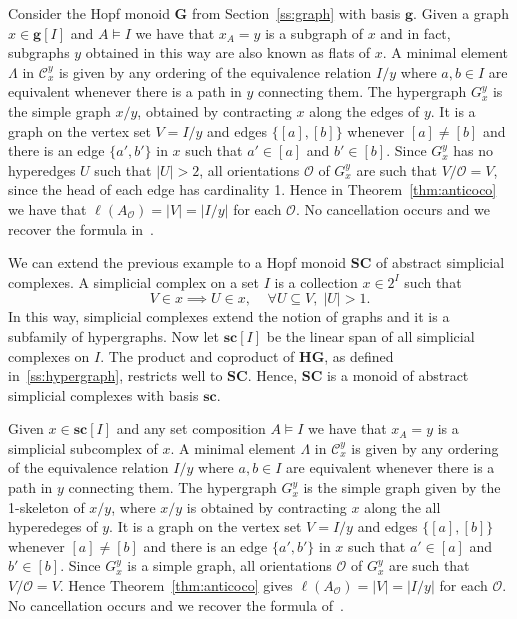 \documentclass[ALCO,ThmDefs,Unicode,epreuves]{cedram}
\newcommand{\bG}{\mathbf{G}}
\begin{document}
\begin{exam} \label{ex:graphdone}
Consider the Hopf monoid $\bG$ from Section~\ref{ss:graph} with basis $\mathbf g$. Given a graph $x\in{\mathbf g}[I]$
and $A\models I$ we have that $x_A=y$ is a subgraph of $x$ and in fact, subgraphs $y$ obtained in this way are also known as flats of $x$.
A minimal element $\Lambda$ in $\mathcal{C}_x^y$ is given by any ordering of the equivalence relation $I/y$ where $a,b\in I$ are equivalent whenever there is a path in $y$ connecting them. 
The hypergraph $G_x^y$ is the simple graph $x/y$, obtained by contracting $x$ along the edges of $y$. It is a graph on the vertex set $V=I/y$ and edges $\{[a],[b]\}$ whenever $[a]\ne [b]$ and there is an edge $\{a',b'\}$ in $x$ such that $a'\in[a]$ and $b'\in[b]$. Since $G_x^y$ has no hyperedges $U$ such that $|U|>2$, all orientations $\mathcal{O}$ of $G_x^y$ 
are such 
that $V/\mathcal{O}=V$, since the head of each edge has cardinality 1. Hence in Theorem~\ref{thm:anticoco} we have that $\ell(A_{\mathcal{O}})=|V|=|I/y|$ for each $\mathcal{O}$.
No cancellation occurs and we recover the formula in~\cite{Benedetti-Sagan,Humpert-Martin}.
\end{exam}

\begin{exam} \label{ex:simplicial}
We can extend the previous example to a Hopf monoid $\mathbf{SC}$ of abstract simplicial complexes. A simplicial complex on a set $I$ is a collection $x\in 2^I$ such that
 $$V\in x \implies U\in x,\;\;\;\; \forall U\subseteq V,\; |U|>1.$$
In this way, simplicial complexes extend the notion of graphs and it is a subfamily of hypergraphs. Now let $\mathbf{sc}[I]$ be the linear span of all simplicial complexes on $I$.
The product and coproduct of $\mathbf{HG}$, as defined in~\ref{ss:hypergraph}, restricts well to $\mathbf{SC}$. Hence, $\mathbf{SC}$ is a monoid of abstract simplicial complexes
with basis $\mathbf{sc}$. 

Given $x\in{\mathbf {sc}}[I]$ and any set composition $A\models I$ we have that $x_A=y$ is a simplicial subcomplex of $x$.
A minimal element $\Lambda$ in $\mathcal{C}_x^y$ is given by any ordering of the equivalence relation $I/y$ where $a,b\in I$ are equivalent whenever there is a path in $y$ connecting them. 
The hypergraph $G_x^y$ is the simple graph given by the 1-skeleton of $x/y$, where $x/y$ is obtained by contracting $x$ along the all hyperedeges of $y$. It is a graph on the vertex set $V=I/y$ and edges $\{[a],[b]\}$ whenever $[a]\ne [b]$ and there is an edge $\{a',b'\}$ in $x$ such that $a'\in[a]$ and $b'\in[b]$. Since $G_x^y$ is a simple graph, all orientations $\mathcal{O}$ of $G_x^y$ 
are such 
that $V/\mathcal{O}=V$. Hence Theorem~\ref{thm:anticoco} gives $\ell(A_{\mathcal{O}})=|V|=|I/y|$ for each $\mathcal{O}$.
No cancellation occurs and we recover the formula of~\cite{BenedettiHallamMachacek}.
\end{exam}
\end{document}
